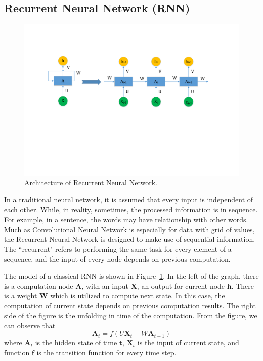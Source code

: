 \subsection{Recurrent Neural Network (RNN)}

\begin{figure}
\centering
\includegraphics[scale=0.6]{figure/rnn.pdf}
\caption{Architecture of Recurrent Neural Network.}
\label{fig:rnn}
\end{figure}

In a traditional neural network, it is assumed that every input is independent of each other. While, in reality, sometimes, the processed information is in sequence. For example, in a sentence, the words may have relationship with other words. Much as Convolutional Neural Network is especially for data with grid of values, the Recurrent Neural Network is designed to make use of sequential information. The ``recurrent" refers to performing the same task for every element of a sequence, and the input of every node depends on previous computation.

The model of a classical RNN is shown in Figure~\ref{fig:rnn}. In the left of the graph, there is a computation node $\textbf{A}$, with an input $\textbf{X}$, an output for current node $\textbf{h}$. There is a weight $\textbf{W}$ which is utilized to compute next state. In this case, the computation of current state depends on previous computation results. The right side of the figure is the unfolding in time of the computation. From the figure, we can observe that
$$\textbf{A}_t = f(U\textbf{X}_t + W\textbf{A}_{t-1})$$
where $\textbf{A}_t$ is the hidden state of time $\textbf{t}$, $\textbf{X}_t$ is the input of current state, and function $\textbf{f}$ is the transition function for every time step. 
